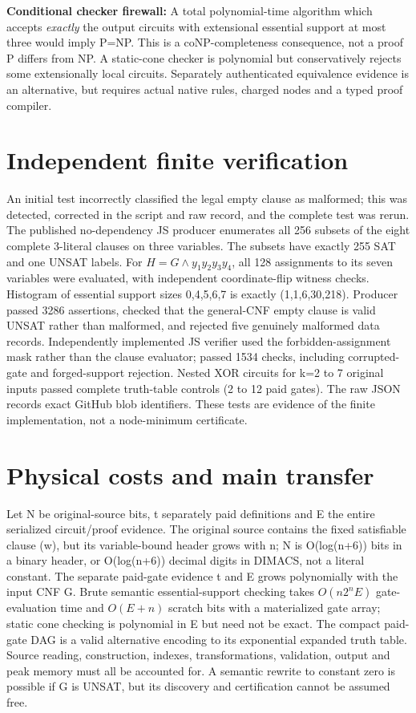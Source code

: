 \documentclass[11pt]{article}
\begin{document}
\noindent\textbf{Conditional checker firewall:} A total polynomial-time algorithm which accepts \emph{exactly} the output circuits with extensional essential support at most three would imply P=NP. This is a coNP-completeness consequence, not a proof P differs from NP. A static-cone checker is polynomial but conservatively rejects some extensionally local circuits. Separately authenticated equivalence evidence is an alternative, but requires actual native rules, charged nodes and a typed proof compiler.

\section*{Independent finite verification}
An initial test incorrectly classified the legal empty clause as malformed; this was detected, corrected in the script and raw record, and the complete test was rerun. The published no-dependency JS producer enumerates all 256 subsets of the eight complete 3-literal clauses on three variables. The subsets have exactly 255 SAT and one UNSAT labels. For \(H=G\wedge y_1y_2y_3y_4\), all 128 assignments to its seven variables were evaluated, with independent coordinate-flip witness checks. Histogram of essential support sizes 0,4,5,6,7 is exactly (1,1,6,30,218). Producer passed 3286 assertions, checked that the general-CNF empty clause is valid UNSAT rather than malformed, and rejected five genuinely malformed data records. Independently implemented JS verifier used the forbidden-assignment mask rather than the clause evaluator; passed 1534 checks, including corrupted-gate and forged-support rejection. Nested XOR circuits for k=2 to 7 original inputs passed complete truth-table controls (2 to 12 paid gates). The raw JSON records exact GitHub blob identifiers. These tests are evidence of the finite implementation, not a node-minimum certificate.

\section*{Physical costs and main transfer}
Let N be original-source bits, t separately paid definitions and E the entire serialized circuit/proof evidence. The original source contains the fixed satisfiable clause (w), but its variable-bound header grows with n; N is O(log(n+6)) bits in a binary header, or O(log(n+6)) decimal digits in DIMACS, not a literal constant. The separate paid-gate evidence t and E grows polynomially with the input CNF G. Brute semantic essential-support checking takes \(O(n2^nE)\) gate-evaluation time and \(O(E+n)\) scratch bits with a materialized gate array; static cone checking is polynomial in E but need not be exact. The compact paid-gate DAG is a valid alternative encoding to its exponential expanded truth table. Source reading, construction, indexes, transformations, validation, output and peak memory must all be accounted for. A semantic rewrite to constant zero is possible if G is UNSAT, but its discovery and certification cannot be assumed free.
\end{document}
